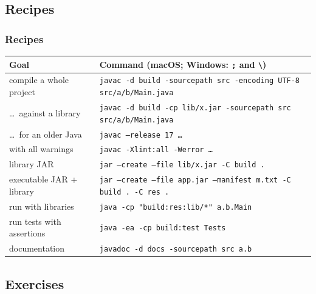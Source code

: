 \documentclass[aspectratio=169,10pt,compress]{beamer}
\begin{document}

\subsection[Recipes]{Recipes}




\begin{frame}[t,fragile] \frametitle{Recipes}
  \footnotesize
  \begin{tabular}{@{}L{0.36\textwidth}L{0.58\textwidth}@{}}
    \toprule
    \textbf{Goal} & \textbf{Command (macOS; Windows: \texttt{;} and \texttt{\textbackslash})} \\
    \midrule
    compile a whole project         & \texttt{javac -d build -sourcepath src -encoding UTF-8 src/a/b/Main.java} \\
    \dots\ against a library        & \texttt{javac -d build -cp lib/x.jar -sourcepath src src/a/b/Main.java} \\
    \dots\ for an older Java        & \texttt{javac --release 17 \dots} \\
    with all warnings               & \texttt{javac -Xlint:all -Werror \dots} \\
    library JAR                     & \texttt{jar --create --file lib/x.jar -C build .} \\
    executable JAR + library        & \texttt{jar --create --file app.jar --manifest m.txt -C build . -C res .} \\
    run with libraries              & \texttt{java -cp "build:res:lib/*" a.b.Main} \\
    run tests with assertions       & \texttt{java -ea -cp build:test Tests} \\
    documentation                   & \texttt{javadoc -d docs -sourcepath src a.b} \\
    \bottomrule
  \end{tabular}
\end{frame}

\subsection[Exercises]{Exercises}
\end{document}
